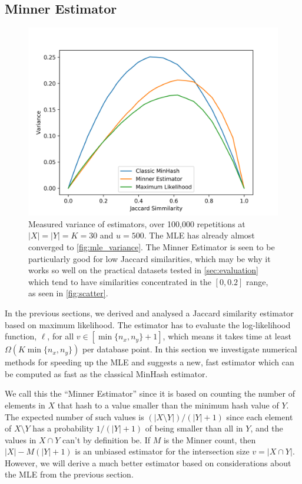 \subsection{Minner Estimator}\label{sec:minner}

\begin{figure}
   \includegraphics[trim=10 0 45 40,clip,width=\linewidth]{figures/synvar_100000.png}
   \caption{Measured variance of estimators, over 100,000 repetitions at $|X|=|Y|=K=30$ and $u=500$.
      The MLE has already almost converged to \cref{fig:mle_variance}.
      The Minner Estimator is seen to be particularly good for low Jaccard similarities, which may be why it works so well on the practical datasets tested in \cref{sec:evaluation} which tend to have similarities concentrated in the $[0,0.2]$ range, as seen in \cref{fig:scatter}.}
   \label{fig:exp_variance}
\end{figure}

In the previous sections, we derived and analysed a Jaccard similarity estimator based on maximum likelihood.
The estimator has to evaluate the log-likelihood function, $\ell$, for all $v\in[\min\{n_x,n_y\}+1]$, which means it takes time at least $\Omega(K\min\{n_x,n_y\})$ per database point.
In this section we investigate numerical methods for speeding up the MLE and suggests a new, fast estimator which can be computed as fast as the classical MinHash estimator.

We call this the ``Minner Estimator'' since it is based on counting the number of elements in $X$ that hash to a value smaller than the minimum hash value of $Y$.
The expected number of such values is $(|X\setminus Y|)/(|Y|+1)$ since each element of $X\setminus Y$ has a probability $1/(|Y|+1)$ of being smaller than all in $Y$, and the values in $X\cap Y$ can't by definition be.
If $M$ is the Minner count, then $|X| - M(|Y|+1)$ is an unbiased estimator for the intersection size $v=|X\cap Y|$.
However, we will derive a much better estimator based on considerations about the MLE from the previous section.

